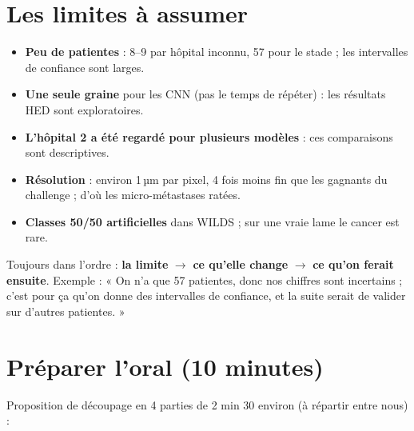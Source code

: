 \documentclass[11pt,a4paper]{article}
\begin{document}
\section{Les limites à assumer}\label{sec:limites}
\begin{itemize}
  \item \textbf{Peu de patientes} : 8–9 par hôpital inconnu, 57 pour le stade ; les intervalles de confiance sont larges.
  \item \textbf{Une seule graine} pour les CNN (pas le temps de répéter) : les résultats HED sont exploratoires.
  \item \textbf{L'hôpital 2 a été regardé pour plusieurs modèles} : ces comparaisons sont descriptives.
  \item \textbf{Résolution} : environ 1\,µm par pixel, 4 fois moins fin que les gagnants du challenge ; d'où les micro-métastases ratées.
  \item \textbf{Classes 50/50 artificielles} dans WILDS ; sur une vraie lame le cancer est rare.
\end{itemize}
\begin{oral}
Toujours dans l'ordre : \textbf{la limite} $\to$ \textbf{ce qu'elle change} $\to$ \textbf{ce qu'on ferait ensuite}. Exemple :
« On n'a que 57 patientes, donc nos chiffres sont incertains ; c'est pour ça qu'on donne des intervalles de confiance, et la
suite serait de valider sur d'autres patientes. »
\end{oral}

\section{Préparer l'oral (10 minutes)}\label{sec:oral}
Proposition de découpage en 4 parties de 2 min 30 environ (à répartir entre nous) :
\end{document}
